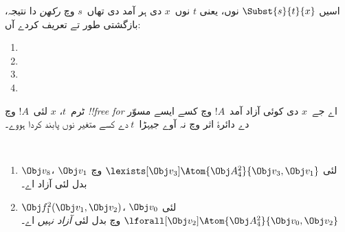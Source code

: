 \documentclass[../../../include/open-logic-section]{subfiles}
\begin{document}


\begin{defn}
اسیں $\Subst{s}{t}{x}$ نوں، یعنی $t$ نوں~$x$ دی
ہر آمد دی تھاں~$s$ وچ \emph{رکھن} دا نتیجہ، بازگشتی
طور تے تعریف کردے آں:
\begin{enumerate}
\item {}

\item {}

\item {}

\item{}
\end{enumerate}
\end{defn}

\begin{defn}
ٹرم~$t$، $x$ لئی~$!A$ وچ \emph{!!{free for}} اے
جے~$x$ دی کوئی آزاد آمد~$!A$ وچ کسے ایسے مسوّر دے
دائرۂ اثر وچ نہ آوے جیہڑا~$t$ دے کسے متغیر نوں پابند کردا ہووے۔
\end{defn}

\begin{ex} ~
\begin{enumerate}
\item $\Obj v_8$، $\Obj v_1$ لئی
$\lexists[\Obj
  v_3]\Atom{\Obj A^2_4}{\Obj v_3,\Obj v_1}$ وچ بدل لئی آزاد اے۔

\item $\Obj f^2_1(\Obj v_1, \Obj v_2)$، $\Obj
  v_0$ لئی $\lforall[\Obj v_2]\Atom{\Obj A^2_4}{\Obj v_0,\Obj v_2}$
  وچ بدل لئی \emph{آزاد نہیں} اے۔
\end{enumerate}
\end{ex}
\end{document}
